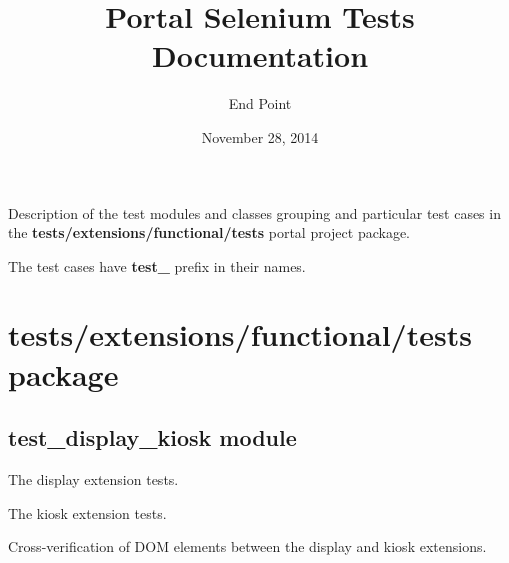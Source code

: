 \documentclass[letterpaper,10pt,english]{sphinxmanual}
\title{Portal Selenium Tests Documentation}
\date{November 28, 2014}
\author{End Point}
\begin{document}
\maketitle
\tableofcontents
{}\label{index::doc}


Description of the test modules and classes grouping and particular test cases
in the \textbf{tests/extensions/functional/tests} portal project package.

The test cases have \textbf{test\_} prefix in their names.


\chapter{tests/extensions/functional/tests package}
\label{modules:tests-extensions-functional-tests-package}\label{modules::doc}\label{modules:portal-selenium-tests-s-documentation}

\section{test\_display\_kiosk module}
\label{test_display_kiosk:module-test_display_kiosk}\label{test_display_kiosk::doc}\label{test_display_kiosk:test-display-kiosk-module}
The display extension tests.

The kiosk extension tests.

Cross-verification of DOM elements between the display and kiosk extensions.
\end{document}
